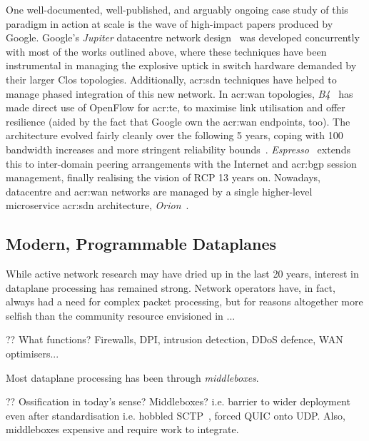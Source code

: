One well-documented, well-published, and arguably ongoing case study of this paradigm in action at scale is the wave of high-impact papers produced by Google.
Google's \emph{Jupiter} datacentre network design~\parencite{DBLP:conf/sigcomm/SinghOAAABBDFGK15} was developed concurrently with most of the works outlined above, where these techniques have been instrumental in managing the explosive uptick in switch hardware demanded by their larger Clos topologies.
Additionally, \gls{acr:sdn} techniques have helped to manage phased integration of this new network.
In \gls{acr:wan} topologies, \emph{B4}~\parencite{DBLP:conf/sigcomm/JainKMOPSVWZZZHSV13} has made direct use of OpenFlow for \gls{acr:te}, to maximise link utilisation and offer resilience (aided by the fact that Google own the \gls{acr:wan} endpoints, too).
The architecture evolved fairly cleanly over the following 5 years, coping with \qty{100}{\times} bandwidth increases and more stringent reliability bounds~\parencite{DBLP:conf/sigcomm/HongMAZABBJKLMP18}.
\emph{Espresso}~\parencite{DBLP:conf/sigcomm/YapMRPHBHKNJLRR17} extends this to inter-domain peering arrangements with the Internet and \gls{acr:bgp} session management, finally realising the vision of RCP 13 years on.
Nowadays, datacentre and \gls{acr:wan} networks are managed by a single higher-level microservice \gls{acr:sdn} architecture, \emph{Orion}~\parencite{DBLP:conf/nsdi/FergusonGHKMMOP21}.

\subsection{Modern, Programmable Dataplanes}\label{sec:modern-pdps}
While active network research may have dried up in the last 20 years, interest in dataplane processing has remained strong.
Network operators have, in fact, always had a need for complex packet processing, but for reasons altogether more selfish than the community resource envisioned in ...

?? What functions? Firewalls, DPI, intrusion detection, DDoS defence, WAN optimisers...

Most dataplane processing has been through \emph{middleboxes}.

?? Ossification in today's sense? Middleboxes? i.e. barrier to wider deployment even after standardisation i.e. hobbled SCTP~\parencite{rfc4960}, forced QUIC onto UDP. Also, middleboxes expensive and require work to integrate.

